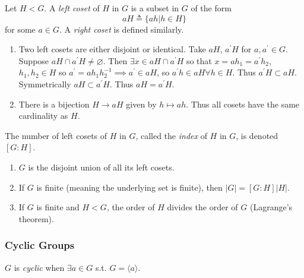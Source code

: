 \documentclass{article}
\begin{document}
\begin{defn}[Coset]
Let $H < G$. A \emph{left coset} of $H$ in $G$ is a subset in $G$ of the form
$$
aH \triangleq \{ ah | h \in H \}
$$
for some $a \in G$. A \emph{right coset} is defined similarly.
\end{defn}

\begin{remark}
\begin{enumerate}
  \item{Two left cosets are either disjoint or identical. Take $aH$,
        $a^\prime H$ for $a, a^\prime \in G$. Suppose 
        $aH \cap a^\prime H \neq \varnothing$. Then 
        $\exists x \in aH \cap a^\prime H$ so that 
        $x = ah_1 = a^\prime h_2$, $h_1, h_2 \in H$ so 
        $a^\prime = a h_1 h_2^{-1} \implies a^\prime \in aH$,
        so $a^\prime h \in aH \forall h \in H$. Thus 
        $a^\prime H \subset aH$. Symmetrically 
        $aH \subset a^\prime H$.
        Thus $aH = a^\prime H$.
       }
  \item{ There is a bijection $H \to aH$ given by $h \mapsto ah$. Thus
         all cosets have the same cardinality as $H$.
       }
\end{enumerate}
\end{remark}

\begin{defn}
The number of left cosets of $H$ in $G$, called the \emph{index} of
$H$ in $G$, is denoted $[G:H]$.
\end{defn}

\begin{corol}
\begin{enumerate}
  \item{$G$ is the disjoint union of all its left cosets.}
  \item{If $G$ is finite (meaning the underlying set is finite), then
        $|G| = [G:H] |H|$.}
  \item{If $G$ is finite and $H < G$, the order of $H$ divides the
        order of $G$ (Lagrange's theorem).}
\end{enumerate}
\end{corol}

\subsubsection{Cyclic Groups}
\begin{defn}
$G$ is \emph{cyclic} when $\exists a \in G$ s.t. 
$G = \langle a \rangle$.
\end{defn}
\end{document}
